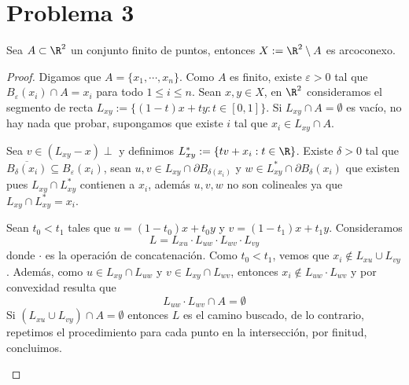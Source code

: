 \documentclass{article}
\begin{document}
\section*{Problema 3}
\begin{lema}
    Sea $A\subset\R^{2}$ un conjunto finito de puntos, entonces $X:=\R^{2}\setminus A$ es 
    arcoconexo.
\end{lema}
\begin{proof}
    Digamos que $A=\{x_{1},\cdots,x_{n}\}$. Como $A$ es finito, existe $\varepsilon>0$ tal que
    $B_{\varepsilon}(x_{i})\cap A=x_{i}$ para todo $1\leq i\leq n$. Sean $x,y\in X$, en $\R^{2}$
    consideramos el segmento de recta $L_{xy}:=\{(1-t)x+ty:t\in[0,1]\}$. Si 
    $L_{xy}\cap A=\emptyset$ es vacío, no hay nada que probar, supongamos que existe $i$ tal que
    $x_{i}\in L_{xy}\cap A$.

    \vspace{2mm}
    \noindent Sea $v\in(L_{xy}-x)\perp$ y definimos $L_{xy}^{*}:=\{tv+x_{i}:t\in\R\}$. Existe 
    $\delta>0$ tal que $\overline{B_{\delta}(x_{i})}\subseteq B_{\varepsilon}(x_{i})$, sean 
    $u,v\in L_{xy}\cap\partial B_{\delta(x_{i})}$ y $w\in L_{xy}^{*}\cap\partial 
    B_{\delta}(x_{i})$ que existen pues $L_{xy}\cap L_{xy}^{*}$ contienen a $x_{i}$, además 
    $u,v,w$ no son colineales ya que $L_{xy}\cap L_{xy}^{*}=x_{i}$.

    \vspace{2mm}
    \noindent Sean $t_{0}<t_{1}$ tales que $u=(1-t_{0})x+t_{0}y$ y $v=(1-t_{1})x+t_{1}y$. 
    Consideramos
    \begin{equation*}
        L=L_{xu}\cdot L_{uw}\cdot L_{wv}\cdot L_{vy}
    \end{equation*}
    donde $\cdot$ es la operación de concatenación. Como $t_{0}<t_{1}$, vemos que 
    $x_{i}\not\in L_{xu}\cup L_{vy}$. Además, como $u\in L_{xy}\cap L_{uw}$ y 
    $v\in L_{xy}\cap L_{wv}$, entonces $x_{i}\not\in L_{uw}\cdot L_{wv}$ y por convexidad resulta
    que
    \begin{equation*}
        L_{uw}\cdot L_{wv}\cap A=\emptyset
    \end{equation*}
    Si $(L_{xu}\cup L_{vy})\cap A=\emptyset$ entonces $L$ es el camino buscado, de lo contrario, 
    repetimos el procedimiento para cada punto en la intersección, por finitud, concluimos.

    \vspace{2mm}
    \begin{center}
\end{center}
\end{proof}
\end{document}
